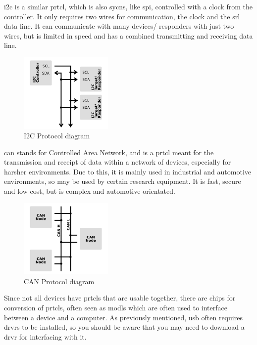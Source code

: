 \documentclass[a4paper,11pt]{report}
\begin{document}
\gls{i2c} is a similar \gls{prtcl}, which is also \gls{sycns}, like \gls{spi}, controlled with a clock from the controller. It only requires two wires for communication, the clock and the \gls{srl} data line. It can communicate with many devices/ responders with just two wires, but is limited in speed and has a combined transmitting and receiving data line.

\begin{figure}[H]
\centering
\includegraphics[width=0.4\textwidth]{I2C}
\caption{I2C Protocol diagram}
\end{figure}

\gls{can} stands for Controlled Area Network, and is a \gls{prtcl} meant for the transmission and receipt of data within a network of devices, especially for harsher environments. Due to this, it is mainly used in industrial and automotive environments, so may be used by certain research equipment. It is fast, secure and low cost, but is complex and automotive orientated.

\begin{figure}[H]
\centering
\includegraphics[width=0.4\textwidth]{CAN}
\caption{CAN Protocol diagram}
\end{figure}

Since not all devices have \gls{prtcl}s that are usable together, there are chips for conversion of \gls{prtcl}s, often seen as \gls{modl}s which are often used to interface between a device and a computer. As previously mentioned, \gls{usb} often requires \gls{drvr}s to be installed, so you should be aware that you may need to download a \gls{drvr} for interfacing with it.
\end{document}
